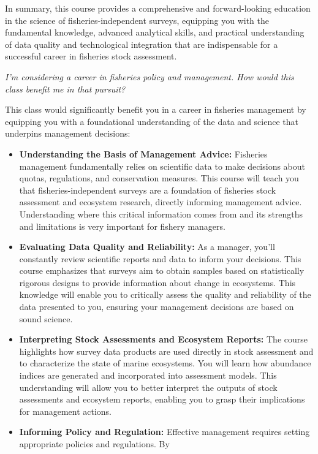 \documentclass[
  letterpaper,
  oneside,
  open=any]{scrbook}
\providecommand{\tightlist}{%
  \setlength{\itemsep}{0pt}\setlength{\parskip}{0pt}}\usepackage{longtable,booktabs,array}
\begin{document}
In summary, this course provides a comprehensive and forward-looking
education in the science of fisheries-independent surveys, equipping you
with the fundamental knowledge, advanced analytical skills, and
practical understanding of data quality and technological integration
that are indispensable for a successful career in fisheries stock
assessment.

\emph{I'm considering a career in fisheries policy and management. How
would this class benefit me in that pursuit?}

This class would significantly benefit you in a career in fisheries
management by equipping you with a foundational understanding of the
data and science that underpins management decisions:

\begin{itemize}
\tightlist
\item
  \textbf{Understanding the Basis of Management Advice:} Fisheries
  management fundamentally relies on scientific data to make decisions
  about quotas, regulations, and conservation measures. This course will
  teach you that fisheries-independent surveys are a foundation of
  fisheries stock assessment and ecosystem research, directly informing
  management advice. Understanding where this critical information comes
  from and its strengths and limitations is very important for fishery
  managers.
\item
  \textbf{Evaluating Data Quality and Reliability:} As a manager, you'll
  constantly review scientific reports and data to inform your
  decisions. This course emphasizes that surveys aim to obtain samples
  based on statistically rigorous designs to provide information about
  change in ecosystems. This knowledge will enable you to critically
  assess the quality and reliability of the data presented to you,
  ensuring your management decisions are based on sound science.
\item
  \textbf{Interpreting Stock Assessments and Ecosystem Reports:} The
  course highlights how survey data products are used directly in stock
  assessment and to characterize the state of marine ecosystems. You
  will learn how abundance indices are generated and incorporated into
  assessment models. This understanding will allow you to better
  interpret the outputs of stock assessments and ecosystem reports,
  enabling you to grasp their implications for management actions.
\item
  \textbf{Informing Policy and Regulation:} Effective management
  requires setting appropriate policies and regulations. By

\end{itemize}
\end{document}
